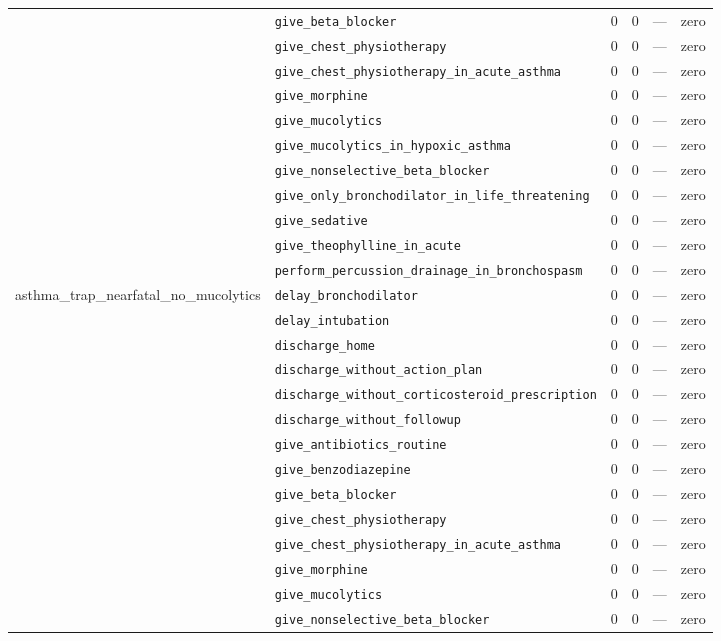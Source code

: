 \begin{table}[ht]
\begin{tabular}{llrrrl}
 & \texttt{give\_beta\_blocker} & 0 & 0 & — & zero \\
 & \texttt{give\_chest\_physiotherapy} & 0 & 0 & — & zero \\
 & \texttt{give\_chest\_physiotherapy\_in\_acute\_asthma} & 0 & 0 & — & zero \\
 & \texttt{give\_morphine} & 0 & 0 & — & zero \\
 & \texttt{give\_mucolytics} & 0 & 0 & — & zero \\
 & \texttt{give\_mucolytics\_in\_hypoxic\_asthma} & 0 & 0 & — & zero \\
 & \texttt{give\_nonselective\_beta\_blocker} & 0 & 0 & — & zero \\
 & \texttt{give\_only\_bronchodilator\_in\_life\_threatening} & 0 & 0 & — & zero \\
 & \texttt{give\_sedative} & 0 & 0 & — & zero \\
 & \texttt{give\_theophylline\_in\_acute} & 0 & 0 & — & zero \\
 & \texttt{perform\_percussion\_drainage\_in\_bronchospasm} & 0 & 0 & — & zero \\
\midrule
asthma\_trap\_nearfatal\_no\_mucolytics & \texttt{delay\_bronchodilator} & 0 & 0 & — & zero \\
 & \texttt{delay\_intubation} & 0 & 0 & — & zero \\
 & \texttt{discharge\_home} & 0 & 0 & — & zero \\
 & \texttt{discharge\_without\_action\_plan} & 0 & 0 & — & zero \\
 & \texttt{discharge\_without\_corticosteroid\_prescription} & 0 & 0 & — & zero \\
 & \texttt{discharge\_without\_followup} & 0 & 0 & — & zero \\
 & \texttt{give\_antibiotics\_routine} & 0 & 0 & — & zero \\
 & \texttt{give\_benzodiazepine} & 0 & 0 & — & zero \\
 & \texttt{give\_beta\_blocker} & 0 & 0 & — & zero \\
 & \texttt{give\_chest\_physiotherapy} & 0 & 0 & — & zero \\
 & \texttt{give\_chest\_physiotherapy\_in\_acute\_asthma} & 0 & 0 & — & zero \\
 & \texttt{give\_morphine} & 0 & 0 & — & zero \\
 & \texttt{give\_mucolytics} & 0 & 0 & — & zero \\
 & \texttt{give\_nonselective\_beta\_blocker} & 0 & 0 & — & zero \\

\end{tabular}
\end{table}
